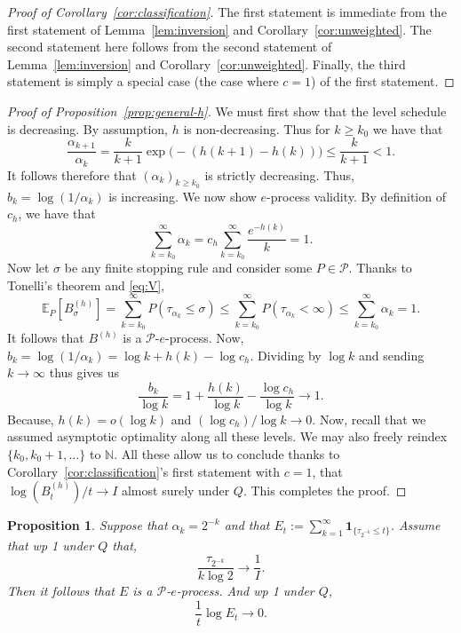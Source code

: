 \documentclass{article}
\newcommand{\PP}{\mathcal P}
\newcommand{\ind}[1]{\mathbf{1}_{\{#1\}}}
\newcommand{\EE}{\mathbb E}
\newtheorem{proposition}[theorem]{Proposition}
\theoremstyle{definition}
\begin{document}
\begin{proof}[Proof of Corollary~\ref{cor:classification}]
The first statement is immediate from the first statement of Lemma~\ref{lem:inversion} and Corollary~\ref{cor:unweighted}. The second statement here follows from the second statement of Lemma~\ref{lem:inversion} and Corollary~\ref{cor:unweighted}. Finally, the third statement is simply a special case (the case where $c=1$) of the first statement.   
\end{proof}

\begin{proof}[Proof of Proposition~\ref{prop:general-h}]
We must first show that the level schedule is decreasing. By assumption, $h$ is non-decreasing. Thus for $k\ge k_0$ we have that
\[
\frac{\alpha_{k+1}}{\alpha_k}=\frac{k}{k+1}\exp\bigl(-(h(k+1)-h(k))\bigr)\le \frac{k}{k+1}<1.
\]
It follows therefore that $(\alpha_k)_{k\ge k_0}$ is strictly decreasing. Thus, $b_k=\log(1/\alpha_k)$ is increasing. We now show $e$-process validity. By definition of $c_h$, we have that
\[
\sum_{k=k_0}^\infty \alpha_k = c_h \sum_{k=k_0}^\infty \frac{e^{-h(k)}}{k} = 1.
\]
Now let $\sigma$ be any finite stopping rule and consider some $P\in\PP$. Thanks to Tonelli's theorem and \eqref{eq:V}, 
\[
\EE_P[B_\sigma^{(h)}] = \sum_{k=k_0}^\infty P(\tau_{\alpha_k}\le \sigma)\le\sum_{k=k_0}^\infty P(\tau_{\alpha_k}<\infty)\le\sum_{k=k_0}^\infty \alpha_k = 1.
\]
It follows that $B^{(h)}$ is a $\PP$-$e$-process. Now, $b_k=\log(1/\alpha_k)=\log k + h(k)-\log c_h$. Dividing by $\log k$ and sending $k\to\infty$ thus gives us
\[
\frac{b_k}{\log k}=1+\frac{h(k)}{\log k}-\frac{\log c_h}{\log k} \longrightarrow 1.
\]
Because, $h(k)=o(\log k)$ and $(\log c_h)/\log k\to 0$. Now, recall that we assumed asymptotic optimality along all these levels. We may also freely reindex $\{k_0, k_0+1,\dots\}$ to $\mathbb N$. All these allow us to conclude thanks to Corollary~\ref{cor:classification}'s first statement with $c=1$, that $\log (B_t^{(h)})/t\to I$ almost surely under $Q$. This completes the proof.
\end{proof}

\begin{proposition}\label{prop:dyadic-count}
Suppose that $\alpha_k=2^{-k}$ and that $E_t:=\sum_{k=1}^\infty \ind{\tau_{2^{-k}}\le t}$. Assume that wp 1 under $Q$ that,
\[
\frac{\tau_{2^{-k}}}{k\log 2}\longrightarrow \frac{1}{I}.
\]
Then it follows that $E$ is a $\mathcal P$-$e$-process. And wp 1 under $Q$,
\[
\frac{1}{t}\log E_t\longrightarrow 0.
\]
\end{proposition}
\end{document}
